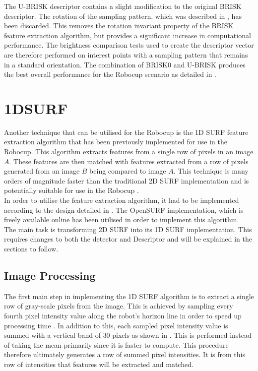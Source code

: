 \documentclass{report}
\begin{document}
The U-BRISK descriptor contains a slight modification to the original BRISK descriptor. The rotation of the sampling pattern, which was described in , has been discarded. This removes the rotation invariant property of the BRISK feature extraction algorithm, but provides a significant increase in computational performance. The brightness comparison tests used to create the descriptor vector are therefore performed on interest points with a sampling pattern that remains in a standard orientation. The combination of BRISK0 and U-BRISK produces the best overall performance for the Robocup scenario as detailed in . \\

\section{1DSURF}
\label{sec:1dsurf}
Another technique that can be utilised for the Robocup is the 1D SURF feature extraction algorithm that has been previously implemented \cite{Anderson} for use in the Robocup. This algorithm extracts features from a single row of pixels in an image $A$. These features are then matched with features extracted from a row of pixels generated from an image $B$ being compared to image $A$. This technique is many orders of magnitude faster than the traditional 2D SURF implementation and is potentially suitable for use in the Robocup \cite{Anderson}.\\

In order to utilise the feature extraction algorithm, it had to be implemented according to the design detailed in \cite{Anderson}. The OpenSURF implementation, which is freely available online \cite{opensurf} has been utilised in order to implement this algorithm.\\

The main task is transforming 2D SURF into its 1D SURF implementation. This requires changes to both the detector and Descriptor and will be explained in the sections to follow.\\

\subsection{Image Processing}
\label{sec:imageProcessing}
The first main step in implementing the 1D SURF algorithm is to extract a single row of gray-scale pixels from the image. This is achieved by sampling every fourth pixel intensity value along the robot's horizon line in order to speed up processing time \cite{Anderson}. 
In addition to this, each sampled pixel intensity value is summed with a vertical band of $30$ pixels as shown in . This is performed instead of taking the mean primarily since it is faster to compute. This procedure therefore ultimately generates a row of summed pixel intensities. It is from this row of intensities that features will be extracted and matched.\\
\end{document}
